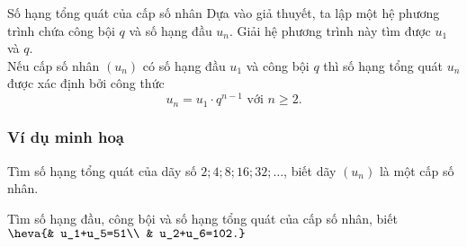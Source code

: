 \begin{dang}{Số hạng tổng quát của cấp số nhân}
	Dựa vào giả thuyết, ta lập một hệ phương trình chứa công bội $ q $ và số hạng đầu $ u_n $. Giải hệ phương trình này tìm được $ u_1 $ và $ q $.\\
	Nếu cấp số nhân $ (u_n) $ có số hạng đầu $ u_1 $ và công bội $ q $ thì số hạng tổng quát $ u_n $ được xác định bởi công thức $$ u_n=u_1\cdot q^{n-1} \text{ với } n\ge 2. $$
\end{dang}
\subsubsection{Ví dụ minh hoạ}
\begin{vd}%
	Tìm số hạng tổng quát của dãy số $ 2;4;8;16;32;\ldots $, biết dãy $ (u_n) $ là một cấp số nhân.  
\end{vd}
\begin{vd}%
	Tìm số hạng đầu, công bội và số hạng tổng quát của cấp số nhân, biết $ \heva{& u_1+u_5=51\\ & u_2+u_6=102.} $
\end{vd}
